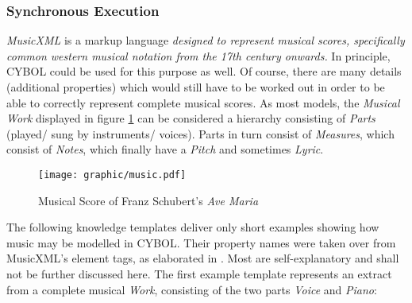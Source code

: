 %
%
%
%
%
%
%

\subsubsection{Synchronous Execution}
\label{synchronous_execution_heading}

\emph{MusicXML} \cite{musicxml} is a markup language \textit{designed to
represent musical scores, specifically common western musical notation from the
17th century onwards.} In principle, CYBOL could be used for this purpose as
well. Of course, there are many details (additional properties) which would
still have to be worked out in order to be able to correctly represent complete
musical scores. As most models, the \emph{Musical Work} displayed in figure
\ref{music_figure} can be considered a hierarchy consisting of \emph{Parts}
(played/ sung by instruments/ voices). Parts in turn consist of
\emph{Measures}, which consist of \emph{Notes}, which finally have a
\emph{Pitch} and sometimes \emph{Lyric}.

\begin{figure}[ht]
    \begin{center}
        \texttt{[image: graphic/music.pdf]}
        \caption{Musical Score of Franz Schubert's \emph{Ave Maria} \cite{musicxml}}
        \label{music_figure}
    \end{center}
\end{figure}

The following knowledge templates deliver only short examples showing how music
may be modelled in CYBOL. Their property names were taken over from MusicXML's
element tags, as elaborated in \cite{musicxml}. Most are self-explanatory and
shall not be further discussed here. The first example template represents an
extract from a complete musical \emph{Work}, consisting of the two parts
\emph{Voice} and \emph{Piano}:

